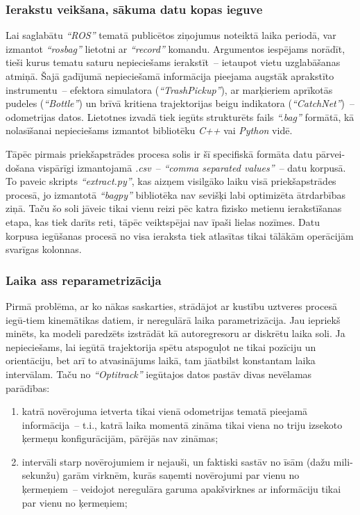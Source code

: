 \documentclass[12pt, a4paper]{article}
\numberwithin{equation}{section} %
\begin{document}
\subsubsection{Ierakstu veikšana, sākuma datu kopas ieguve}

Lai saglabātu \textit{``ROS''} tematā publicētos ziņojumus noteiktā laika periodā, var izmantot \textit{``rosbag''} lietotni ar \textit{``record''} komandu. Argumentos iespējams norādīt, tieši kurus tematu saturu nepieciešams ierakstīt~-- ietaupot vietu uzglabāšanas atmiņā. Šajā gadījumā nepieciešamā informācija pieejama augstāk aprakstīto instrumentu~-- efektora simulatora (\textit{``TrashPickup''}), ar marķieriem aprīkotās pudeles (\textit{``Bottle''}) un brīvā kritiena trajektorijas beigu indikatora (\textit{``CatchNet''})~-- odometrijas datos.  Lietotnes izvadā tiek iegūts strukturēts fails \textit{``.bag''} formātā, kā nolasīšanai nepieciešams izmantot bibliotēku \textit{C++} vai \textit{Python} vidē.

Tāpēc pirmais priekšapstrādes procesa solis ir šī specifiskā formāta datu pārvei-došana vispārīgi izmantojamā \textit{.csv}~-- \textit{``comma separated values''}~-- datu korpusā. To paveic skripts \textit{``extract.py''}, kas aizņem visilgāko laiku visā priekšapstrādes procesā, jo izmantotā \textit{``bagpy''} bibliotēka nav sevišķi labi optimizēta ātrdarbības ziņā. Taču šo soli jāveic tikai vienu reizi pēc katra fizisko metienu ierakstīšanas etapa, kas tiek darīts reti, tāpēc veiktspējai nav īpaši lielas nozīmes. Datu korpusa iegūšanas procesā no visa ieraksta tiek atlasītas tikai tālākām operācijām svarīgas kolonnas.

\subsubsection{Laika ass reparametrizācija}

Pirmā problēma, ar ko nākas saskarties, strādājot ar kustību uztveres procesā iegū-tiem kinemātikas datiem, ir neregulārā laika parametrizācija. Jau iepriekš minēts, ka modeli paredzēts izstrādāt kā autoregresoru ar diskrētu laika soli. Ja nepieciešams, lai iegūtā trajektorija spētu atspoguļot ne tikai pozīciju un orientāciju, bet arī to atvasinājums laikā, tam jāatbilst konstantam laika intervālam. Taču no \textit{``Optitrack''} iegūtajos datos pastāv divas nevēlamas parādības:

\begin{enumerate}
    \item katrā novērojuma ietverta tikai vienā odometrijas tematā pieejamā informācija~-- t.i., katrā laika momentā zināma tikai viena no triju izsekoto ķermeņu konfigurācijām, pārējās nav zināmas;
    \item intervāli starp novērojumiem ir nejauši, un faktiski sastāv no īsām (dažu mili-sekunžu) garām virknēm, kurās saņemti novērojumi par vienu no ķermeņiem~-- veidojot neregulāra garuma apakšvirknes ar informāciju tikai par vienu no ķermeņiem;
\end{enumerate}
\end{document}
